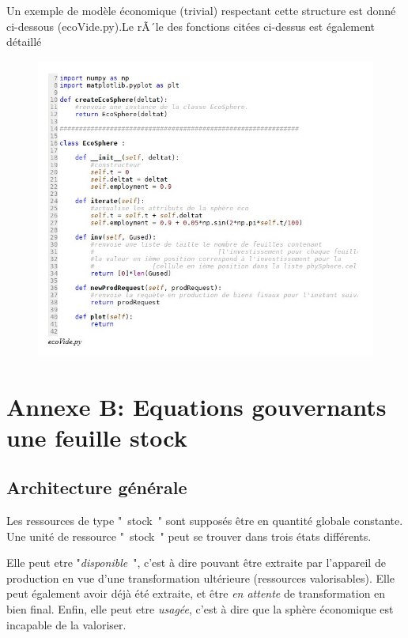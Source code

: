 \documentclass[12pt,a4paper]{article}%
\begin{document}
Un exemple de modèle économique (trivial) respectant cette structure est
donné ci-dessous (ecoVide.py).\newline Le rÃ´le des fonctions citées ci-dessus
est également détaillé

\begin{figure}[h]
\centering
\includegraphics[width=1.0\textwidth]{figures/EcoVide-py.jpg}\end{figure}

\section{Annexe B: Equations gouvernants une feuille stock}

\subsection{Architecture générale}

Les ressources de type "~stock~" sont supposés être en quantité globale
constante. Une unité de ressource "~stock~" peut se trouver dans trois états différents.

Elle peut etre "\textit{disponible}~", c'est à dire pouvant être extraite
par l'appareil de production en vue d'une transformation ultérieure
(ressources valorisables). Elle peut également avoir déjà été extraite, et
être \textit{en attente} de transformation en bien final. Enfin, elle peut
etre \textit{usagée}, c'est à dire que la sphère économique est
incapable de la valoriser.
\end{document}
